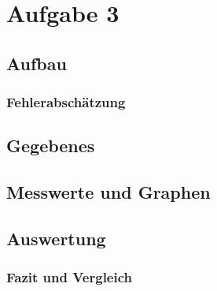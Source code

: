 \section{Aufgabe 3}
\subsection{Aufbau}
\subsubsection{Fehlerabschätzung}
\subsection{Gegebenes}
\subsection{Messwerte und Graphen}
\subsection{Auswertung}
\subsubsection{Fazit und Vergleich}